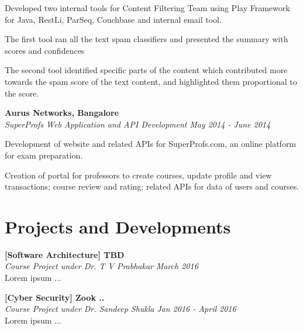 \documentclass[margin,10pt]{resume}
\begin{document}
\begin{resume}
\begin{list2}
	\begin{list3}
	\item Developed two internal tools for Content Filtering Team using Play Framework for Java, RestLi, ParSeq, Couchbase and internal email tool.
	\item The first tool ran all the text spam classifiers and presented the summary with scores and confidences
	\item The second tool identified specific parts of the content which contributed more towards the spam score of the text content, and highlighted them proportional to the score.
	\end{list3}

	\vspace{13mm}

\item \textbf{Aurus Networks, Bangalore}\\
\textsl{SuperProfs Web Application and API Development} \hfill \emph{May 2014 - June 2014}

	\begin{list3}
	\item Development of website and related APIs for SuperProfs.com, an online platform for exam preparation.\vspace{1mm}
	\item Creation of portal for professors to create courses, update profile and view transactions; course review and rating; related APIs for data of users and courses.
	\end{list3}
\end{list2}

\newpage
\section{\mysidestyle Projects and Developments}
\begin{list2}

\item \textbf{[Software Architecture] TBD }\\
	\textsl{Course Project under Dr. T V Prabhakar} \hfill \emph{March 2016}\\
	Lorem ipsum ...

	\vspace{4mm}

\item \textbf{[Cyber Security] Zook .. }\\
	\textsl{Course Project under Dr. Sandeep Shukla} \hfill \emph{Jan 2016 - April 2016}\\
	Lorem ipsum ...


\end{list2}
\end{resume}
\end{document}
